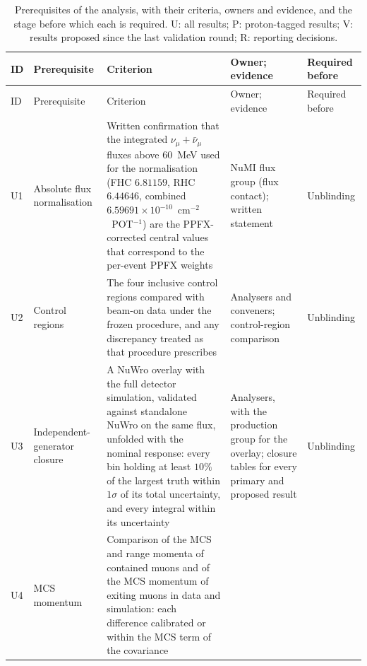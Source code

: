 {\footnotesize\setlength{\tabcolsep}{4pt}
\setlength{\LTcapwidth}{\textwidth}
\begin{longtable}{@{}p{0.6cm}p{2.5cm}p{5.9cm}p{2.8cm}p{2.4cm}@{}}
\caption{Prerequisites of the analysis, with their criteria, owners and evidence, and the stage before
  which each is required. U: all results; P: proton-tagged results; V: results proposed since the last
  validation round; R: reporting decisions.}
\label{tab:prerequisites}\\
\toprule
ID & Prerequisite & Criterion & Owner; evidence & Required before \\
\midrule
\endfirsthead
\toprule
ID & Prerequisite & Criterion & Owner; evidence & Required before \\
\midrule
\endhead
\bottomrule
\endfoot
U1 & Absolute flux normalisation &
  Written confirmation that the integrated $\nu_\mu+\bar\nu_\mu$ fluxes above $60$~MeV used for the
  normalisation (FHC $6.81159$, RHC $6.44646$, combined $6.59691\times10^{-10}$~cm$^{-2}$~POT$^{-1}$) are the
  PPFX-corrected central values that correspond to the per-event PPFX weights &
  NuMI flux group (flux contact); written statement & Unblinding \\
U2 & Control regions &
  The four inclusive control regions compared with beam-on data under the frozen procedure, and any
  discrepancy treated as that procedure prescribes &
  Analysers and conveners; control-region comparison & Unblinding \\
U3 & Independent-generator closure &
  A NuWro overlay with the full detector simulation, validated against standalone NuWro on the same flux,
  unfolded with the nominal response: every bin holding at least $10\%$ of the largest truth within
  $1\sigma$ of its total uncertainty, and every integral within its uncertainty &
  Analysers, with the production group for the overlay; closure tables for every primary and proposed
  result & Unblinding \\
U4 & MCS momentum &
  Comparison of the MCS and range momenta of contained muons and of the MCS momentum of exiting muons in
  data and simulation: each difference calibrated or within the MCS term of the covariance &

\end{longtable}}
